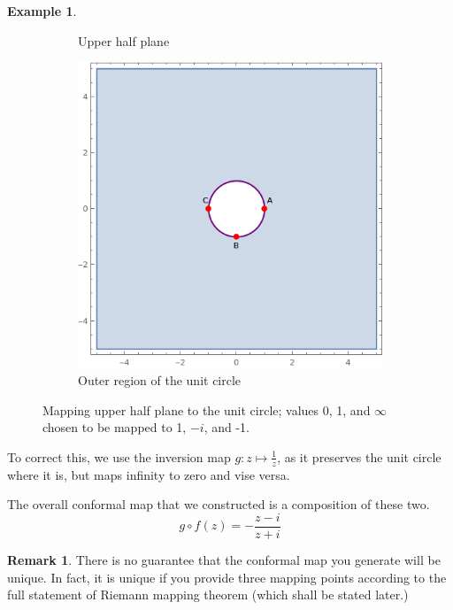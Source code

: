 \documentclass[a4paper, 12pt]{article}
\theoremstyle{definition}
\newtheorem{example}{Example}
\newtheorem{remark}{Remark}
\numberwithin{theorem}{section}
\numberwithin{definition}{section}
\numberwithin{exercise}{section}
\numberwithin{remark}{section}
\numberwithin{figure}{section}
\numberwithin{example}{section}
\begin{document}
\begin{example}
\begin{figure}[tbp]
\begin{subfigure}[b]{0.5\textwidth}
            \caption{Upper half plane}
        \end{subfigure}
        \hfill
        \begin{subfigure}[b]{0.5\textwidth}
            \centering
            \includegraphics[width=\textwidth]{UnitCircle2}
            \caption{Outer region of the unit circle}
        \end{subfigure}
        \caption{Mapping upper half plane to the unit circle; values 0, 1, and $\infty$ chosen to be mapped to 1, $-i$, and -1.}
        \label{fig: UHP to Unit Circle 2}
    \end{figure}
    To correct this, we use the inversion map $g:z \mapsto \frac{1}{z}$, as it preserves the unit circle where it is,
    but maps infinity to zero and vise versa.
    
    The overall conformal map that we constructed is a composition of these two.
    \begin{equation*}
        g \circ f (z) = - \frac{z-i}{z+i}
    \end{equation*}
\end{example}
\begin{remark}
    There is no guarantee that the conformal map you generate will be unique.
    In fact, it is unique if you provide three mapping points according to the full statement of Riemann mapping theorem (which shall be stated later.)
\end{remark}
\end{document}
